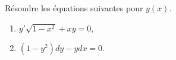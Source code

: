 \begin{exercice}\label{exoEquaDiff0001}

Résoudre les équations suivantes pour $y(x)$.
\begin{enumerate}

\item
$y'\sqrt{1-x^2}+xy=0$,
\item
$(1-y^2)dy-ydx=0$.

\end{enumerate}

\end{exercice}
